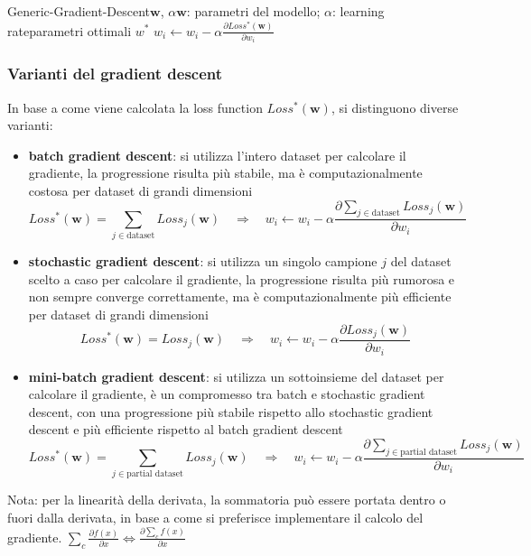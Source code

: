 \begin{algo}{Generic-Gradient-Descent}{$\textbf{w}$, $\alpha$}{$\textbf{w}$: parametri del modello; $\alpha$: learning rate}{parametri ottimali $w^*$}
	\Repeat
			 \(\displaystyle w_i \gets w_i - \alpha \frac{\partial Loss^*(\textbf{w})}{\partial w_i}\) 
		\EndFor
\end{algo}

\subsubsection*{Varianti del gradient descent}
In base a come viene calcolata la loss function \(Loss^*(\textbf{w})\), si distinguono diverse varianti:
\begin{itemize}
	\item \textbf{batch gradient descent}: si utilizza l'intero dataset per calcolare il gradiente, la progressione risulta
	più stabile, ma è computazionalmente costosa per dataset di grandi dimensioni
	\[Loss^*(\textbf{w}) = \sum_{j \in \text{dataset}} Loss_j(\textbf{w}) \quad\Rightarrow\quad w_i \gets w_i - \alpha \frac{\partial \sum_{j \in \text{dataset}} Loss_j(\textbf{w})}{\partial w_i}\]
	\item \textbf{stochastic gradient descent}: si utilizza un singolo campione \(j\) del dataset scelto a caso per calcolare
	il gradiente, la progressione risulta più rumorosa e non sempre converge correttamente, ma è computazionalmente più
	efficiente per dataset di grandi dimensioni
	\[Loss^*(\textbf{w}) = Loss_j(\textbf{w}) \quad\Rightarrow\quad w_i \gets w_i - \alpha \frac{\partial Loss_j(\textbf{w})}{\partial w_i}\]
	\item \textbf{mini-batch gradient descent}: si utilizza un sottoinsieme del dataset per calcolare il gradiente, è un
	compromesso tra batch e stochastic gradient descent, con una progressione più stabile rispetto allo stochastic gradient
	descent e più efficiente rispetto al batch gradient descent
	\[Loss^*(\textbf{w}) = \sum_{j \in \text{partial dataset}} Loss_j(\textbf{w}) \quad\Rightarrow\quad w_i \gets w_i - \alpha \frac{\partial \sum_{j \in \text{partial dataset}} Loss_j(\textbf{w})}{\partial w_i}\]
\end{itemize}
Nota: per la linearità della derivata, la sommatoria può essere portata dentro o fuori dalla derivata, in base a come si
preferisce implementare il calcolo del gradiente. \(\sum_c \frac{\partial f(x)}{\partial x} \Leftrightarrow \frac{\partial \sum_c f(x)}{\partial x}\)

